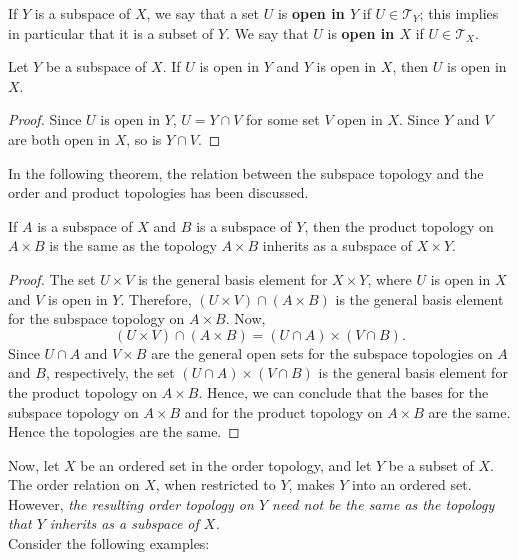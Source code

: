 \documentclass[a4paper,english,12pt]{article}
\begin{document}
\begin{defn}
	If $Y$ is a subspace of $X$, we say that a set $U$ is \textbf{open in $Y$} if $U \in \mathcal{T}_Y$; this implies in particular that it is a subset of $Y$. We say that $U$ is \textbf{open in $X$} if $U \in \mathcal{T}_X$.
\end{defn} 

\begin{lem}
	Let $Y$ be a subspace of $X$. If $U$ is open in $Y$ and $Y$ is open in $X$, then $U$ is open in $X$.
\end{lem}
\begin{proof}
	Since $U$ is open in $Y$, $U = Y \cap V$ for some set $V$ open in $X$. Since $Y$ and $V$ are both open in $X$, so is $Y \cap V$.
\end{proof}

In the following theorem, the relation between the subspace topology and the order and product topologies has been discussed.

\begin{thm}
	If $A$ is a subspace of $X$ and $B$ is a subspace of $Y$, then the product
	topology on $A \times B$ is the same as the topology $A \times B$ inherits as a subspace of $X \times Y$.
\end{thm}

\begin{proof}
	The set $U \times V$ is the general basis element for $X \times Y$, where $U$ is open in $X$ and $V$ is open in $Y$. Therefore, $(U \times V) \cap (A \times B)$ is the general basis element for the subspace topology on $A \times B$. Now,
	\[ (U \times V) \cap (A \times B) = (U \cap A) \times (V \cap B). \]
	Since $U \cap A$ and $V \times B$ are the general open sets for the subspace topologies on $A$ and $B$, respectively, the set $(U \cap A) \times (V \cap B)$ is the general basis element for the product topology on $A \times B$.
	Hence, we can conclude that the bases for the subspace topology on $A \times B$ and for the product topology on $A \times B$ are the same. Hence the topologies are the same.
\end{proof}

Now, let $X$ be an ordered set in the order topology, and let $Y$ be a subset of $X$. The order relation on $X$, when restricted to $Y$, makes $Y$ into an ordered set. However, \textit{the resulting order topology on $Y$ need not be the same as the topology that $Y$ inherits as a subspace of $X$.} \\
Consider the following examples:
\end{document}
